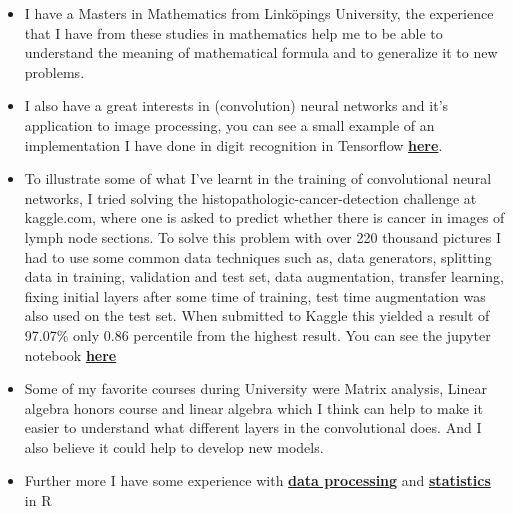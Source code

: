 \documentclass[]{article}
\begin{document}
\begin{itemize}
\item
  I have a Masters in Mathematics from Linköpings University, the
  experience that I have from these studies in
  mathematics help me to be able to understand the meaning of mathematical
  formula and to generalize it to new problems.
\item
  I also have a great interests in (convolution) neural networks and
  it's application to image processing, you can see a small example of
  an implementation I have done in digit recognition in Tensorflow
  \href{https://github.com/HHA123/Job/blob/master/TensorflowNNdigit.ipynb}{\textbf{here}}.

\item
  To illustrate some of what I've learnt in the training of
 convolutional neural networks, I tried solving the histopathologic-cancer-detection challenge
 at kaggle.com, where one is asked to predict whether there is cancer
 in images of lymph node sections. To solve this problem with over 220 thousand
pictures I had to use some common data techniques such as, data generators,
 splitting data in training, validation and test set, data augmentation,
transfer learning, fixing initial layers after some time of training,
 test time augmentation was also used on the test set.
 When submitted to Kaggle this yielded a result of 97.07\% only 0.86 percentile
 from the highest result.
You can see the jupyter notebook \href{https://github.com/HHA123/Job/blob/master/histo-pat-cancer.ipynb}{\textbf{here}}

  

\item
 Some of my favorite courses during University were Matrix analysis, Linear algebra
honors course and linear algebra which
I think can help to make it easier to understand what
 different layers in the convolutional does. And I also believe it could help to develop
new models.

 


\item
  Further more I have some experience with
\href{https://github.com/HHA123/Job/blob/master/RepRes2.html}
{\textbf{data processing}} and
  \href{https://github.com/HHA123/Job/blob/master/Statinf2.Rmd}{\textbf{statistics}}
  in R



\end{itemize}
\end{document}
